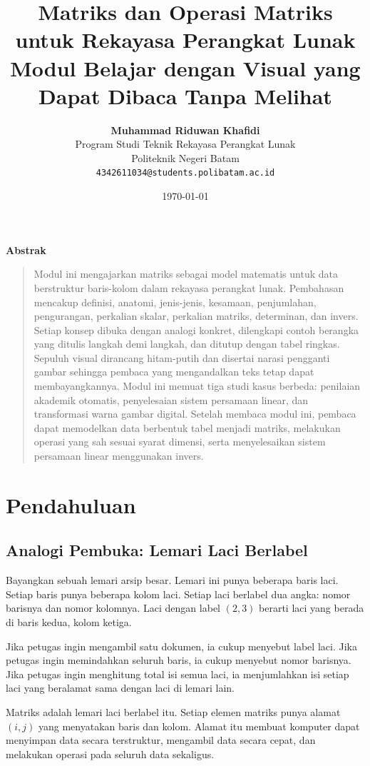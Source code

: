 \documentclass[11pt,a4paper]{article}
\title{\vspace{-1.5cm}\textbf{\sffamily\LARGE Matriks dan Operasi Matriks untuk Rekayasa Perangkat Lunak\\ Modul Belajar dengan Visual yang Dapat Dibaca Tanpa Melihat}}
\author{
	\textbf{Muhammad Riduwan Khafidi} \\
	\small Program Studi Teknik Rekayasa Perangkat Lunak \\
	\small Politeknik Negeri Batam \\
	\small \texttt{4342611034@students.polibatam.ac.id}
}
\date{\small\today}
\renewenvironment{abstract}
{\small
	\begin{center}\textbf{\sffamily Abstrak}\end{center}
	\begin{quote}}
	{\end{quote}}
\begin{document}
\maketitle
\thispagestyle{empty}

\begin{abstract}
	Modul ini mengajarkan matriks sebagai model matematis untuk data berstruktur baris-kolom dalam rekayasa perangkat lunak. Pembahasan mencakup definisi, anatomi, jenis-jenis, kesamaan, penjumlahan, pengurangan, perkalian skalar, perkalian matriks, determinan, dan invers. Setiap konsep dibuka dengan analogi konkret, dilengkapi contoh berangka yang ditulis langkah demi langkah, dan ditutup dengan tabel ringkas. Sepuluh visual dirancang hitam-putih dan disertai narasi pengganti gambar sehingga pembaca yang mengandalkan teks tetap dapat membayangkannya. Modul ini memuat tiga studi kasus berbeda: penilaian akademik otomatis, penyelesaian sistem persamaan linear, dan transformasi warna gambar digital. Setelah membaca modul ini, pembaca dapat memodelkan data berbentuk tabel menjadi matriks, melakukan operasi yang sah sesuai syarat dimensi, serta menyelesaikan sistem persamaan linear menggunakan invers.
\end{abstract}

\section{Pendahuluan}

\subsection{Analogi Pembuka: Lemari Laci Berlabel}

Bayangkan sebuah lemari arsip besar. Lemari ini punya beberapa baris laci. Setiap baris punya beberapa kolom laci. Setiap laci berlabel dua angka: nomor barisnya dan nomor kolomnya. Laci dengan label $(2,3)$ berarti laci yang berada di baris kedua, kolom ketiga.

Jika petugas ingin mengambil satu dokumen, ia cukup menyebut label laci. Jika petugas ingin memindahkan seluruh baris, ia cukup menyebut nomor barisnya. Jika petugas ingin menghitung total isi semua laci, ia menjumlahkan isi setiap laci yang beralamat sama dengan laci di lemari lain.

Matriks adalah lemari laci berlabel itu. Setiap elemen matriks punya alamat $(i,j)$ yang menyatakan baris dan kolom. Alamat itu membuat komputer dapat menyimpan data secara terstruktur, mengambil data secara cepat, dan melakukan operasi pada seluruh data sekaligus.
\end{document}
